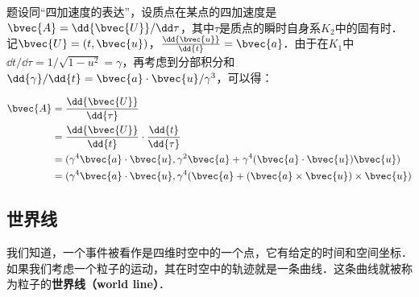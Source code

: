 题设同“四加速度的表达”，设质点在某点的四加速度是$\bvec{A}=\dd{\bvec{U}}/\dd\tau$，其中$\tau$是质点的瞬时自身系$K_2$中的固有时．记$\bvec{U}=(t, \bvec{u})$，$\frac{\dd{\bvec{u}}}{\dd{t}}=\bvec{a}$．由于在$K_1$中$\dd{t}/\dd{\tau}=1/\sqrt{1-u^2}=\gamma$，再考虑到分部积分和$\dd{\gamma}/\dd{t}=\bvec{a}\cdot\bvec{u}/\gamma^3$，可以得：

\begin{equation}
\begin{aligned}
%
\bvec{A}&=\frac{\dd{\bvec{U}}}{\dd{\tau}}\\&=\frac{\dd{\bvec{U}}}{\dd{t}}\cdot\frac{\dd{t}}{\dd{\tau}}\\&=(\gamma^4\bvec{a}\cdot\bvec{u}, \gamma^2\bvec{a}+\gamma^4(\bvec{a}\cdot\bvec{u})\bvec{u})\\&=(\gamma^4\bvec{a}\cdot\bvec{u}, \gamma^4(\bvec{a}+(\bvec{a}\times\bvec{u})\times\bvec{u})
%
\end{aligned}
\end{equation}

\subsection{世界线}

我们知道，一个事件被看作是四维时空中的一个点，它有给定的时间和空间坐标．如果我们考虑一个粒子的运动，其在时空中的轨迹就是一条曲线．这条曲线就被称为粒子的\textbf{世界线（world line）}．


